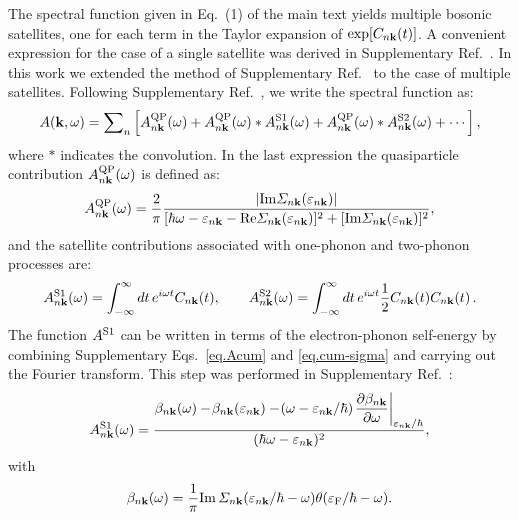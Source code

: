 \documentclass[12pt]{nature-mod}
\def\bk{{\bf k}}
\def\ve{\varepsilon}
\begin{document}
The spectral function given in Eq.~(1) of the main text yields multiple bosonic satellites, one
for each term in the Taylor expansion of $\exp [C_{n\bk}(t)]$. A convenient expression for the
case of a single satellite was derived in Supplementary Ref.~. 
In this work we extended the method of Supplementary Ref.~ 
to the case of multiple satellites. Following Supplementary 
Ref.~, we write the spectral function as:
 \begin{equation} \label{eq.spec.cum}
 A(\bk,\omega)={\sum}_n 
  \left[A_{n\bk}^{\rm{QP}}(\omega)+A_{n\bk}^{\rm{QP}}(\omega)\ast A_{n\bk}^{\rm S1}(\omega)
    +A_{n\bk}^{\rm{QP}}(\omega)\ast A_{n\bk}^{\rm S2}(\omega) + \cdots\right],
 \end{equation}
where $\ast$ indicates the convolution. In the last expression
the quasiparticle contribution $A_{n\bk}^{\rm{QP}}(\omega)$ is defined as:
 \begin{equation} \label{eq.Aqp}
  A_{n\bk}^{\rm{QP}}(\omega)= \frac{2}{\pi}\frac{|{\rm Im}\varSigma_{n\bk}(\ve_{n\bk})|}
    {[\hbar\omega-\ve_{n\bk}-{\rm Re}\varSigma_{n\bk}(\ve_{n\bk})]^2+[{\rm Im}\varSigma_{n\bk}(\ve_{n\bk})]^2} ,
 \end{equation}
and the satellite contributions associated with one-phonon and two-phonon processes are:
\begin{equation} \label{eq.Acum}
 A_{n\bk}^{\rm S1}(\omega) = \int_{-\infty}^{\infty} dt\,e^{i\omega t}  C_{n\bk}(t),
    \qquad A_{n\bk}^{\rm S2}(\omega) =  
  \int_{-\infty}^{\infty} dt\,e^{i\omega t}  \frac{1}{2}C_{n\bk}(t)C_{n\bk}(t) \,.
\end{equation}
The function $A^{\rm S1}$ can be written in terms of the electron-phonon self-energy by combining 
Supplementary Eqs.~\eqref{eq.Acum} and \eqref{eq.cum-sigma} and carrying out the Fourier 
transform. This step was performed in Supplementary Ref.~: 
 \begin{equation}\label{eq-spectrum2}
  A_{n\bk}^{\rm S1}(\omega)  
  =  \frac{\beta_{n{\bf k}}(\omega) - \!\beta_{n{\bf k}}(\varepsilon_{n{\bf k}}) - 
  \!(\omega-\varepsilon_{n{\bf k}}/\hbar)\!\left. 
  \displaystyle\frac{\partial \beta_{n{\bf k}}}{\partial \omega}
    \right|_{\varepsilon_{n{\bf k}}/\hbar}}
  {(\hbar\omega-\varepsilon_{n{\bf k}})^2}, 
  \end{equation}
 with
 \begin{equation}
  \beta_{n{\bf k}}(\omega) = \frac{1}{\pi}{\rm Im}\,\varSigma_{n{\bf k}}(\varepsilon_{n{\bf k}}/\hbar-\omega)
\theta(\ve_{\rm F}/\hbar-\omega).
 \end{equation}
\end{document}
